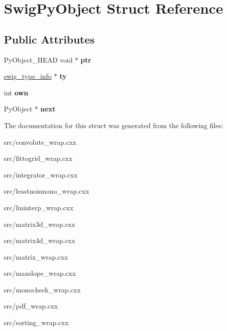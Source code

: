\hypertarget{structSwigPyObject}{
\section{SwigPyObject Struct Reference}
\label{d4/d88/structSwigPyObject}
}
\subsection*{Public Attributes}
\begin{DoxyCompactItemize}
\item 
\hypertarget{structSwigPyObject_a96e168de04fa2da0125cf00f26ea6b9c}{
PyObject\_\-HEAD void $\ast$ {\bfseries ptr}}
\label{d4/d88/structSwigPyObject_a96e168de04fa2da0125cf00f26ea6b9c}

\item 
\hypertarget{structSwigPyObject_a77f6f8357ce9c50f7c18c2a4ea72ea62}{
\hyperlink{structswig__type__info}{swig\_\-type\_\-info} $\ast$ {\bfseries ty}}
\label{d4/d88/structSwigPyObject_a77f6f8357ce9c50f7c18c2a4ea72ea62}

\item 
\hypertarget{structSwigPyObject_a83cb6489fb1b171467f06c091ae6f283}{
int {\bfseries own}}
\label{d4/d88/structSwigPyObject_a83cb6489fb1b171467f06c091ae6f283}

\item 
\hypertarget{structSwigPyObject_a6d423675e9561f658562d3d24f4f70d0}{
PyObject $\ast$ {\bfseries next}}
\label{d4/d88/structSwigPyObject_a6d423675e9561f658562d3d24f4f70d0}

\end{DoxyCompactItemize}


The documentation for this struct was generated from the following files:\begin{DoxyCompactItemize}
\item 
src/convolute\_\-wrap.cxx\item 
src/fittogrid\_\-wrap.cxx\item 
src/integrator\_\-wrap.cxx\item 
src/leastnonmono\_\-wrap.cxx\item 
src/lininterp\_\-wrap.cxx\item 
src/matrix3d\_\-wrap.cxx\item 
src/matrix4d\_\-wrap.cxx\item 
src/matrix\_\-wrap.cxx\item 
src/maxslope\_\-wrap.cxx\item 
src/monocheck\_\-wrap.cxx\item 
src/pdf\_\-wrap.cxx\item 
src/sorting\_\-wrap.cxx\end{DoxyCompactItemize}
